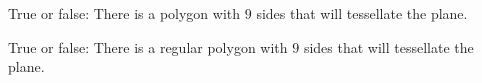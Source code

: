 \documentclass{ximera}
\author{Bart Snapp}
\begin{document}
\begin{exercise}
  True or false: There is a polygon with $9$ sides that will
  tessellate the plane.
  \begin{prompt}
    \begin{multipleChoice}
    \end{multipleChoice}
  \end{prompt}
  \begin{exercise}
    True or false: There is a regular polygon with $9$ sides that
    will tessellate the plane.
    \begin{prompt}
      \begin{multipleChoice}
      \end{multipleChoice}
    \end{prompt}
  \end{exercise}
\end{exercise}
\end{document}
